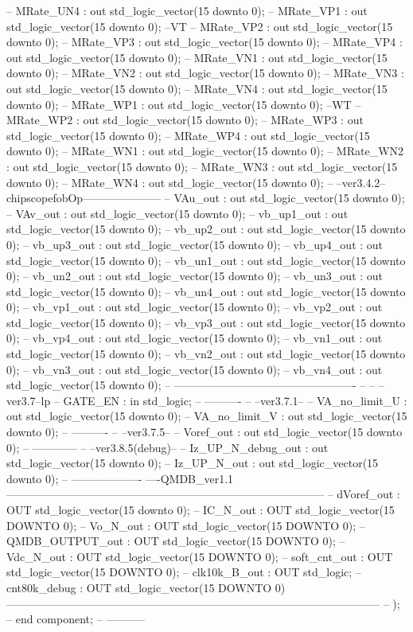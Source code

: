 \begin{mylisting}[language=VHDL,caption=トップモジュール,label=appF_Top_module_VHDL]
--			MRate_UN4	: out	std_logic_vector(15 downto 0);
--			MRate_VP1	: out	std_logic_vector(15 downto 0);		--VT
--			MRate_VP2	: out	std_logic_vector(15 downto 0);
--			MRate_VP3	: out	std_logic_vector(15 downto 0);
--			MRate_VP4	: out	std_logic_vector(15 downto 0);
--			MRate_VN1	: out	std_logic_vector(15 downto 0);
--			MRate_VN2	: out	std_logic_vector(15 downto 0);
--			MRate_VN3	: out	std_logic_vector(15 downto 0);
--			MRate_VN4	: out	std_logic_vector(15 downto 0);
--			MRate_WP1	: out	std_logic_vector(15 downto 0);		--WT
--			MRate_WP2	: out	std_logic_vector(15 downto 0);
--			MRate_WP3	: out	std_logic_vector(15 downto 0);
--			MRate_WP4	: out	std_logic_vector(15 downto 0);
--			MRate_WN1	: out	std_logic_vector(15 downto 0);
--			MRate_WN2	: out	std_logic_vector(15 downto 0);
--			MRate_WN3	: out	std_logic_vector(15 downto 0);
--			MRate_WN4	: out	std_logic_vector(15 downto 0);
--			--ver3.4.2--chipscopefobOp---------------------
--			VAu_out 		: out std_logic_vector(15 downto 0);
--			VAv_out 		: out std_logic_vector(15 downto 0);
--			vb_up1_out  : out std_logic_vector(15 downto 0);
--			vb_up2_out  : out std_logic_vector(15 downto 0);
--			vb_up3_out  : out std_logic_vector(15 downto 0);
--			vb_up4_out  : out std_logic_vector(15 downto 0);
--			vb_un1_out  : out std_logic_vector(15 downto 0);
--			vb_un2_out  : out std_logic_vector(15 downto 0);
--			vb_un3_out  : out std_logic_vector(15 downto 0);
--			vb_un4_out  : out std_logic_vector(15 downto 0);
--			vb_vp1_out  : out std_logic_vector(15 downto 0);
--			vb_vp2_out  : out std_logic_vector(15 downto 0);
--			vb_vp3_out  : out std_logic_vector(15 downto 0);
--			vb_vp4_out  : out std_logic_vector(15 downto 0);
--			vb_vn1_out  : out std_logic_vector(15 downto 0);
--			vb_vn2_out  : out std_logic_vector(15 downto 0);
--			vb_vn3_out  : out std_logic_vector(15 downto 0);
--			vb_vn4_out  : out std_logic_vector(15 downto 0);
--			-------------------------------------------------
--			
--			--ver3.7--lp
--			GATE_EN : in std_logic;
--			----------
--			--ver3.7.1--
--			VA_no_limit_U : out std_logic_vector(15 downto 0);
--			VA_no_limit_V : out std_logic_vector(15 downto 0);
--			----------
--			--ver3.7.5--
--			Voref_out	: out std_logic_vector(15 downto 0);
--			------------
--			--ver3.8.5(debug)--
--			Iz_UP_N_debug_out : out std_logic_vector(15 downto 0);
--			Iz_UP_N_out 		: out std_logic_vector(15 downto 0);
--			-------------------
----QMDB_ver1.1--------------------------------------------------------------------------------------
--		   dVoref_out       : OUT     std_logic_vector(15 downto 0);
--		   IC_N_out	        : OUT   	std_logic_vector(15 DOWNTO 0);
--	 	   Vo_N_out	        : OUT 	   std_logic_vector(15 DOWNTO 0);
--	 	   QMDB_OUTPUT_out  : OUT     std_logic_vector(15 DOWNTO 0);
--	 	   Vdc_N_out		  : OUT     std_logic_vector(15 DOWNTO 0);
--		  soft_cnt_out		: OUT		 std_logic_vector(15 DOWNTO 0);
--		  clk10k_B_out			: OUT 	 std_logic;
--		  	cnt80k_debug		: OUT		 std_logic_vector(15 DOWNTO 0)
-----------------------------------------------------------------------------------------------------
--			);
--	end component;
--	-----------
	

\end{mylisting}
